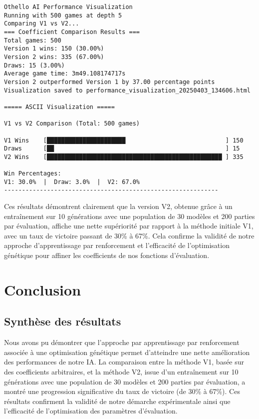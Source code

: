 \documentclass[a4paper,12pt]{article}
\begin{document}
\begin{verbatim}
Othello AI Performance Visualization
Running with 500 games at depth 5
Comparing V1 vs V2...
=== Coefficient Comparison Results ===
Total games: 500
Version 1 wins: 150 (30.00%)      
Version 2 wins: 335 (67.00%)      
Draws: 15 (3.00%)
Average game time: 3m49.108174717s
Version 2 outperformed Version 1 by 37.00 percentage points
Visualization saved to performance_visualization_20250403_134606.html

===== ASCII Visualization =====

V1 vs V2 Comparison (Total: 500 games)

V1 Wins    [██████████████████████                            ] 150
Draws      [██                                                ] 15
V2 Wins    [█████████████████████████████████████████████████ ] 335

Win Percentages:
V1: 30.0%  |  Draw: 3.0%  |  V2: 67.0%
------------------------------------------------------------
\end{verbatim}

Ces résultats démontrent clairement que la version V2, obtenue grâce à un entraînement sur 10 générations avec une population de 30 modèles et 200 parties par évaluation, affiche une nette supériorité par rapport à la méthode initiale V1, avec un taux de victoire passant de 30\% à 67\%. Cela confirme la validité de notre approche d'apprentissage par renforcement et l'efficacité de l'optimisation génétique pour affiner les coefficients de nos fonctions d'évaluation.

\section{Conclusion}
\subsection{Synthèse des résultats}
Nous avons pu démontrer que l'approche par apprentissage par renforcement associée à une optimisation génétique permet d'atteindre une nette amélioration des performances de notre IA. La comparaison entre la méthode V1, basée sur des coefficients arbitraires, et la méthode V2, issue d'un entraînement sur 10 générations avec une population de 30 modèles et 200 parties par évaluation, a montré une progression significative du taux de victoire (de 30\% à 67\%). Ces résultats confirment la validité de notre démarche expérimentale ainsi que l'efficacité de l'optimisation des paramètres d'évaluation.
\end{document}
